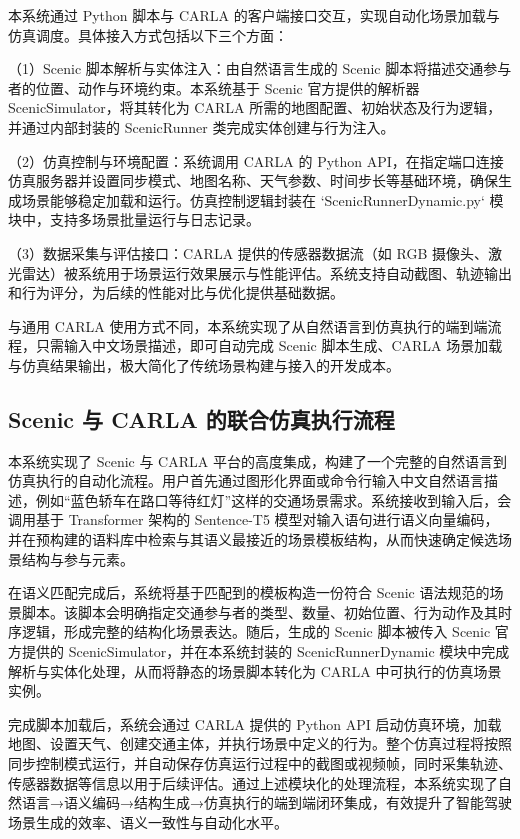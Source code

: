 本系统通过 Python 脚本与 CARLA 的客户端接口交互，实现自动化场景加载与仿真调度。具体接入方式包括以下三个方面：


	（1）Scenic 脚本解析与实体注入：由自然语言生成的 Scenic 脚本将描述交通参与者的位置、动作与环境约束。本系统基于 Scenic 官方提供的解析器 ScenicSimulator，将其转化为 CARLA 所需的地图配置、初始状态及行为逻辑，并通过内部封装的 ScenicRunner 类完成实体创建与行为注入。
	
	（2）仿真控制与环境配置：系统调用 CARLA 的 Python API，在指定端口连接仿真服务器并设置同步模式、地图名称、天气参数、时间步长等基础环境，确保生成场景能够稳定加载和运行。仿真控制逻辑封装在 `ScenicRunnerDynamic.py` 模块中，支持多场景批量运行与日志记录。
	
	（3）数据采集与评估接口：CARLA 提供的传感器数据流（如 RGB 摄像头、激光雷达）被系统用于场景运行效果展示与性能评估。系统支持自动截图、轨迹输出和行为评分，为后续的性能对比与优化提供基础数据。

与通用 CARLA 使用方式不同，本系统实现了从自然语言到仿真执行的端到端流程，只需输入中文场景描述，即可自动完成 Scenic 脚本生成、CARLA 场景加载与仿真结果输出，极大简化了传统场景构建与接入的开发成本。


\subsection{Scenic 与 CARLA 的联合仿真执行流程}

本系统实现了 Scenic 与 CARLA 平台的高度集成，构建了一个完整的自然语言到仿真执行的自动化流程。用户首先通过图形化界面或命令行输入中文自然语言描述，例如“蓝色轿车在路口等待红灯”这样的交通场景需求。系统接收到输入后，会调用基于 Transformer 架构的 Sentence-T5 模型对输入语句进行语义向量编码，并在预构建的语料库中检索与其语义最接近的场景模板结构，从而快速确定候选场景结构与参与元素。

在语义匹配完成后，系统将基于匹配到的模板构造一份符合 Scenic 语法规范的场景脚本。该脚本会明确指定交通参与者的类型、数量、初始位置、行为动作及其时序逻辑，形成完整的结构化场景表达。随后，生成的 Scenic 脚本被传入 Scenic 官方提供的 ScenicSimulator，并在本系统封装的 ScenicRunnerDynamic 模块中完成解析与实体化处理，从而将静态的场景脚本转化为 CARLA 中可执行的仿真场景实例。

完成脚本加载后，系统会通过 CARLA 提供的 Python API 启动仿真环境，加载地图、设置天气、创建交通主体，并执行场景中定义的行为。整个仿真过程将按照同步控制模式运行，并自动保存仿真运行过程中的截图或视频帧，同时采集轨迹、传感器数据等信息以用于后续评估。通过上述模块化的处理流程，本系统实现了自然语言→语义编码→结构生成→仿真执行的端到端闭环集成，有效提升了智能驾驶场景生成的效率、语义一致性与自动化水平。



